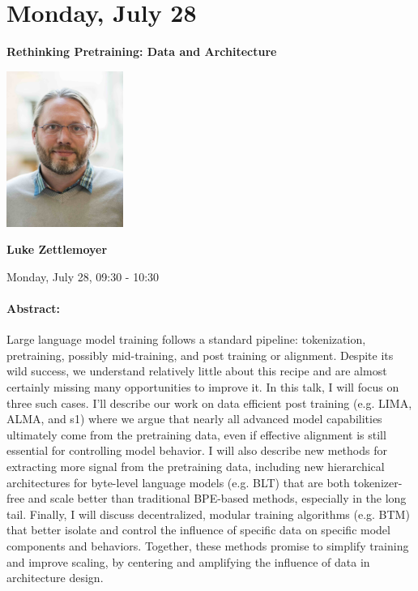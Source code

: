 \section{Monday, July 28}


\begin{center}
    {\Large \textbf{Rethinking Pretraining: Data and Architecture}}
    
    \includegraphics[width=1.5in]{examples/acl25-handbook/invited_talks/luke.jpg}
    
    {\large \textbf{Luke Zettlemoyer}}

    Monday, July 28, 09:30 - 10:30
\end{center}

\paragraph{Abstract:}
Large language model training follows a standard pipeline: tokenization, pretraining, possibly mid-training, and post training or alignment. Despite its wild success, we understand relatively little about this recipe and are almost certainly missing many opportunities to improve it. In this talk, I will focus on three such cases. I’ll describe our work on data efficient post training (e.g. LIMA, ALMA, and s1) where we argue that nearly all advanced model capabilities ultimately come from the pretraining data, even if effective alignment is still essential for controlling model behavior. I will also describe new methods for extracting more signal from the pretraining data, including new hierarchical architectures for byte-level language models (e.g. BLT) that are both tokenizer-free and scale better than traditional BPE-based methods, especially in the long tail. Finally, I will discuss decentralized, modular training algorithms (e.g. BTM) that better isolate and control the influence of specific data on specific model components and behaviors. Together, these methods promise to simplify training and improve scaling, by centering and amplifying the influence of data in architecture design. 

